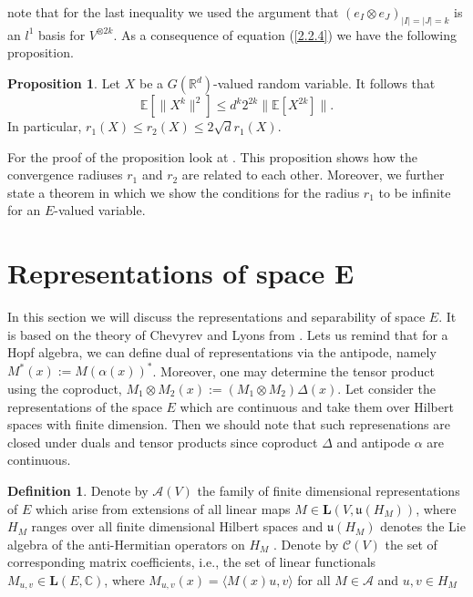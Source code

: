 \documentclass[12pt,a4paper]{report}
\theoremstyle{definition}
\newtheorem{proposition}{Proposition}
\newtheorem{definition}{Definition}
\begin{document}
note that for the last inequality we used the argument that $(e_I \otimes e_J)_{|I|=|J|=k}$ is an $l^1$ basis for $V^{\otimes 2k}$. As a consequence of  equation (\ref{2.2.4}) we have the following proposition.

\begin{proposition}\label{prop2.2.4}
	Let $X$ be a $G(\mathbb{R}^d)$-valued random variable. It follows that 
	\begin{equation}
			\mathbb{E}[\|X^k \|^2]\leq d^k 2^{2k}\|\mathbb{E}[X^{2k}] \|.
	\end{equation}
	In particular, $r_1(X)\leq r_2(X)\leq 2 \sqrt{d}r_1(X)$.
\end{proposition}

For the proof of the proposition look at \parencite[][Chapter 3]{chevyrev2016characteristic}. This proposition shows how the convergence radiuses $r_1$ and $r_2$ are related to each other. Moreover, we further state a theorem in which we show the conditions for the radius $r_1$ to be infinite for an $E$-valued variable.


\section{Representations of space E}

In this section we will discuss the representations and separability of space $E$. It is based on the theory of Chevyrev and Lyons from \parencite{chevyrev2016characteristic}.
Lets us remind that for a Hopf algebra, we can define dual of representations via  the antipode, namely $M^*(x):=M(\alpha(x))^*$. Moreover, one may determine the tensor product using the coproduct, $M_1\otimes M_2(x):=(M_1\otimes M_2)\Delta(x)$. Let consider the representations of the space $E$ which are continuous and take them over Hilbert spaces with finite dimension. Then we should note that such represenations are closed under duals and tensor products since coproduct $\Delta$ and antipode $\alpha$ are continuous.

\begin{definition}\parencite[see][]{chevyrev2016characteristic}
	Denote by $\mathcal{A}(V)$ the family of finite dimensional representations	of $E$ which arise from extensions of all linear maps $M \in \textbf{L}(V, \mathfrak{u}(H_M ))$, where $H_M$ ranges over all finite dimensional Hilbert spaces and $\mathfrak{u}(H_M )$ denotes the Lie algebra of the anti-Hermitian operators on $H_M$ . Denote by $\mathcal{C}(V)$ the set of corresponding matrix coefficients, i.e., the set of linear functionals $M_{u,v} \in \textbf{L}(E, \mathbb{C})$, where $M_{u,v}(x) =\langle M(x)u,v\rangle$ for all $M \in \mathcal{A}$ and $u, v \in H_M$
\end{definition}
\end{document}

